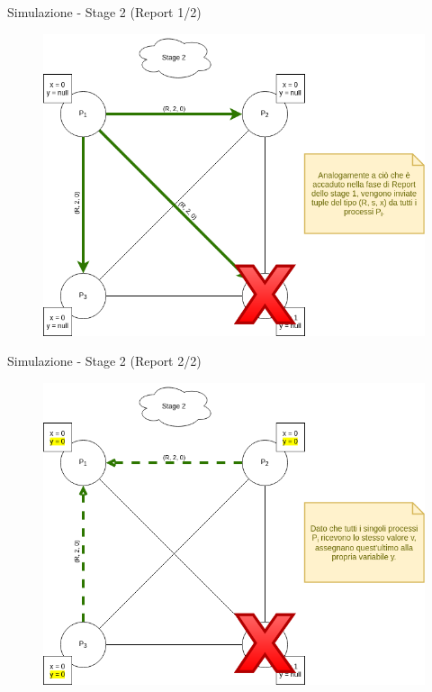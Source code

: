 \documentclass{beamer}
\begin{document}
\begin{frame}{Simulazione - Stage 2 (Report 1/2)}
\begin{figure}
    \centering
    \includegraphics[scale=0.35]{simulazione/simulazione8.png}
\end{figure}
\end{frame}

\begin{frame}{Simulazione - Stage 2 (Report 2/2)}
\begin{figure}
    \centering
    \includegraphics[scale=0.35]{simulazione/simulazione9.png}
\end{figure}
\end{frame}
\end{document}
